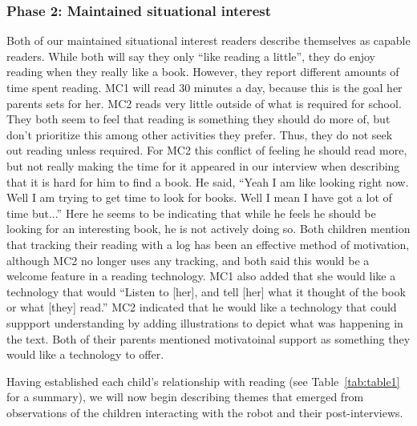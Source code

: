 \documentclass{sigchi}
\begin{document}
\subsubsection{Phase 2: Maintained situational interest}
Both of our maintained situational interest readers describe themselves as capable readers. While both will say they only ``like reading a little'', they do enjoy reading when they really like a book. However, they report different amounts of time spent reading. MC1 will read 30 minutes a day, because this is the goal her parents sets for her. MC2 reads very little outside of what is required for school. They both seem to feel that reading is something they should do more of, but don't prioritize this among other activities they prefer. Thus, they do not seek out reading unless required. For MC2 this conflict of feeling he should read more, but not really making the time for it appeared in our interview when describing that it is hard for him to find a book. He said, ``Yeah I am like looking right now. Well I am trying to get time to look for books. Well I mean I have got a lot of time but...'' Here he seems to be indicating that while he feels he should be looking for an interesting book, he is not actively doing so. Both children mention that tracking their reading with a log has been an effective method of motivation, although MC2 no longer uses any tracking, and both said this would be a welcome feature in a reading technology. MC1 also added that she would like a technology that would ``Listen to [her], and tell [her] what it thought of the book or what [they] read.'' MC2 indicated that he would like a technology that could suppport understanding by adding illustrations to depict what was happening in the text. Both of their parents mentioned motivatoinal support as something they would like a technology to offer.

Having established each child's relationship with reading (see Table~\ref{tab:table1} for a summary), we will now begin describing themes that emerged from observations of the children interacting with the robot and their post-interviews.
\end{document}
